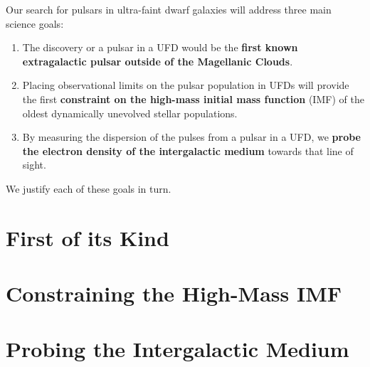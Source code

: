 Our search for pulsars in ultra-faint dwarf galaxies will address three main science goals:
\begin{enumerate}
\item The discovery or a pulsar in a UFD would be the \textbf{first known extragalactic pulsar outside of the Magellanic Clouds}.
\item Placing observational limits on the pulsar population in UFDs will provide the first \textbf{constraint on the high-mass initial mass function} (IMF) of the oldest dynamically unevolved stellar populations.
\item By measuring the dispersion of the pulses from a pulsar in a UFD, we \textbf{probe the electron density of the intergalactic medium} towards that line of sight.
\end{enumerate}
We justify each of these goals in turn.

\section{First of its Kind}


\section{Constraining the High-Mass IMF}


\section{Probing the Intergalactic Medium}

